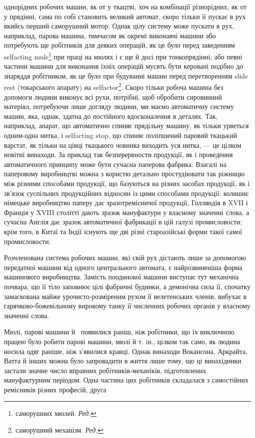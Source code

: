 \parcont{}  %
однорідних робочих машин, як от у ткацтві, хоч на комбінації
різнорідних, як от у прядінні, сама по собі становить великий
автомат, скоро тільки її пускає в рух якийсь перший саморушний
мотор. Однак цілу систему може пускати в рух, наприклад,
парова машина, тимчасом як окремі виконавчі машини або потребують
ще робітників для деяких операцій, як це було перед заведенням
selfacting mule\footnote*{
саморушних мюлей. \emph{Ред.}
} при праці на мюлях і є ще й досі при тонкопрядінні;
або певні частини машини для виконання їхніх операцій
мусять бути керовані подібно до знаряддя робітником, як це було
при будуванні машин перед перетворенням slide rest (токарського
апарату) на selfactor\footnote*{
саморушний механізм. \emph{Ред.}
}. Скоро тільки робоча машина без допомоги
людини виконує всі рухи, потрібні, щоб обробити сировинний
матеріял, потребуючи лише догляду людини, ми маємо автоматичну
систему машин, яка, однак, здатна до постійного вдосконалення
в деталях. Так, наприклад, апарат, що автоматично
спиняє прядільну машину, як тільки урветься одним-одна нитка,
і selfacting stop, що спиняє поліпшений паровий ткацький варстат,
як тільки на цівці ткацького човника виходить уся нитка, — це
цілком новітні винаходи. За приклад так безперервности продукції,
як і проведення автоматичного принципу може бути сучасна
паперова фабрика. Взагалі на паперовому виробництві можна з користю
детально простудіювати так ріжницю між різними способами
продукції, що базуються на різних засобах продукції, як
і зв’язок суспільних продукційних відносин із цими способами
продукції: колишнє німецьке виробництво паперу дає зразотремісничої
продукції, Голляндія в XVII і Франція у XVIII столітті
дають зразок мануфактури у власному значенні слова, а сучасна
Англія дає зразок автоматичної фабрикації в цій галузі промисловости;
крім того, в Китаї та Індії існують ще дві різні староазійські
форми такої самої промисловости.

Розчленована система робочих машин, які свій рух дістають лише
за допомогою передатної машини від одного центрального автомата,
є найрозвиненіша форма машинового виробництва. Замість
поодинокої машини виступає тут механічна почвара, що її тіло
заповнює цілі фабричні будинки, а демонічна сила її, спочатку
замаскована майже урочисто-розміреним рухом її велетенських
членів, вибухає в гарячково-божевільному вировому танку її
численних робочих органів у власному значенні слова.

Мюлі, парові машини й~ появилися раніш, ніж робітники,
що їх виключною працею було робити парові машини, мюлі й
т. iн., цілком так само, як людина носила одяг раніше, ніж з’явилися
кравці. Однак винаходи Вокансона, Аркрайта, Ватта
й інших можна було запровадити в життя лише тому, що ці винахідники
застали значне число вправних робітників-механіків,
підготовлених мануфактурним періодом. Одна частина цих робітників
складалася з самостійних ремісників різних професій, друга
\parbreak{}  %
